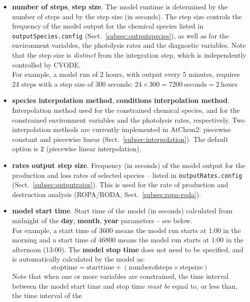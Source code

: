 \begin{itemize}
\item \textbf{number of steps}, \textbf{step size}. The model runtime is determined by the
  number of steps and by the step size (in seconds). The step size controls the frequency of
  the model output for the chemical species listed in \texttt{outputSpecies.config}
  (Sect.~\ref{subsec:outputspecies}), as well as for the environment variables, the photolysis
  rates and the diagnostic variables. Note that the step size is \emph{distinct} from the
  integration step, which is independently controlled by CVODE.\\
  For example, a model run of 2 hours, with output every 5 minutes, requires 24 steps with a
  step size of 300 seconds: $24 \times 300 = 7200~\mathrm{seconds} = 2~\mathrm{hours}$
\item \textbf{species interpolation method}, \textbf{conditions interpolation method}.
  Interpolation method used for the constrained chemical species, and for the constrained
  environment variables and the photolysis rates, respectively. Two interpolation methods are
  currently implemented in AtChem2: piecewise constant and piecewise linear
  (Sect.~\ref{subsec:interpolation}). The default option is \texttt{2} (piecewise linear
  interpolation).
\item \textbf{rates output step size}. Frequency (in seconds) of the model output for the
  production and loss rates of selected species -- listed in \texttt{outputRates.config}
  (Sect.~\ref{subsec:outputrates}). This is used for the rate of production and destruction
  analysis (ROPA/RODA, Sect.~\ref{subsec:ropa-roda}).
\item \textbf{model start time}. Start time of the model (in seconds) calculated from midnight
  of the \textbf{day}, \textbf{month}, \textbf{year} parameters -- see below.\\
  For example, a start time of 3600 means the model run starts at 1:00 in the morning and a
  start time of 46800 means the model run starts at 1:00 in the afternoon (13:00). The
  \textbf{model stop time} does not need to be specified, and is automatically calculated by
  the model as:
  \begin{equation}
    \mathrm{stop time} = \mathrm{start time} + (\mathrm{number of steps} \times \mathrm{step size})
  \end{equation}
  Note that when one or more variables are constrained, the time interval between the model
  start time and stop time \emph{must be} equal to, or less than, the time interval of the

\end{itemize}
